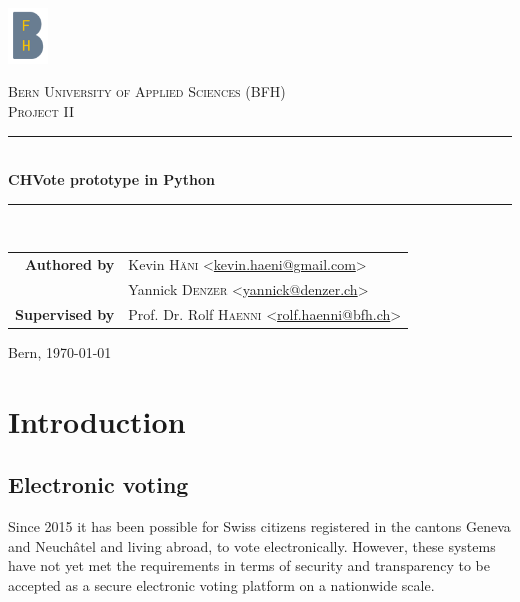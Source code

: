 \documentclass[a4paper,12pt]{report}
\begin{document}

\begin{titlepage}
\begin{center}
	\includegraphics[width=0.08\textwidth]{images/bfh_logo.png}

	\vspace{1cm}

	\textsc{\LARGE Bern University of Applied Sciences (BFH)} \\[1.5cm]
	\textsc{\Large Project II} \\[0.5cm]

	\newcommand{\HRule}{\rule{\linewidth}{0.3mm}}
	\HRule \\[0.4cm]
	{\huge \bfseries CHVote prototype in Python} \\[0.3cm]
	\HRule \\[1.5cm]

	\begin{tabular}{rl}
	\textbf{Authored by}
	& Kevin \textsc{Häni} <\href{mailto:kevin.haeni@gmail.com}{kevin.haeni@gmail.com}> \\
	& Yannick \textsc{Denzer} <\href{mailto:yannick@denzer.ch}{yannick@denzer.ch}> \\
	\textbf{Supervised by}
	& Prof. Dr. Rolf \textsc{Haenni} <\href{mailto:rolf.haenni@bfh.ch}{rolf.haenni@bfh.ch}> \\
	\end{tabular}

	\vspace{1.5cm}


	\vfill

	Bern, {\large \today}
\end{center}
\end{titlepage}

\clearpage
\tableofcontents


\clearpage
\chapter{Introduction}
\section{Electronic voting}
Since 2015 it has been possible for Swiss citizens registered in the cantons Geneva and Neuchâtel and living abroad, to vote electronically. However, these systems have not yet met the requirements in terms of security and transparency to be accepted as a secure electronic voting platform on a nationwide scale.
\end{document}
